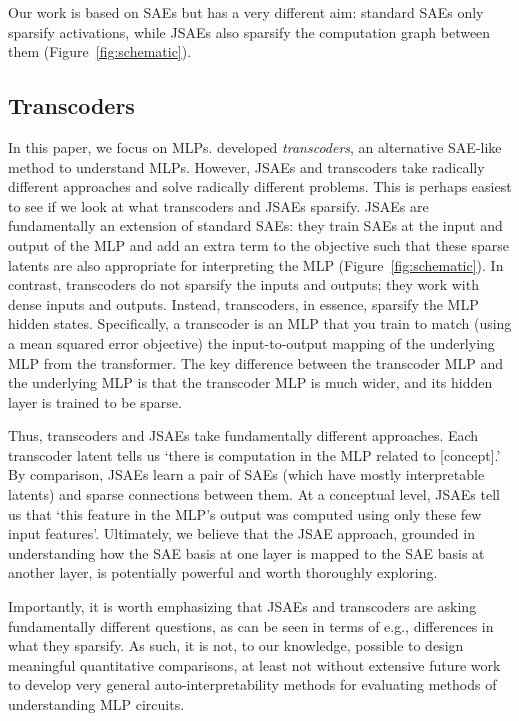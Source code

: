 Our work is based on SAEs but has a very different aim: standard SAEs only sparsify activations, while JSAEs also sparsify the computation graph between them (Figure~\ref{fig:schematic}).

\subsection{Transcoders}

In this paper, we focus on MLPs.
\citet{dunefsky_transcoders_2024,templeton_predicting_2024} developed \emph{transcoders}, an alternative SAE-like method to understand MLPs. 
However, JSAEs and transcoders take radically different approaches and solve radically different problems.
This is perhaps easiest to see if we look at what transcoders and JSAEs sparsify.
JSAEs are fundamentally an extension of standard SAEs: they train SAEs at the input and output of the MLP and add an extra term to the objective such that these sparse latents are also appropriate for interpreting the MLP (Figure~\ref{fig:schematic}).
In contrast, transcoders do not sparsify the inputs and outputs; they work with dense inputs and outputs.
Instead, transcoders, in essence, sparsify the MLP hidden states.
Specifically, a transcoder is an MLP that you train to match (using a mean squared error objective) the input-to-output mapping of the underlying MLP from the transformer.
The key difference between the transcoder MLP and the underlying MLP is that the transcoder MLP is much wider, and its hidden layer is trained to be sparse.

Thus, transcoders and JSAEs take fundamentally different approaches.
Each transcoder latent tells us `there is computation in the MLP related to [concept].'
By comparison, JSAEs learn a pair of SAEs (which have mostly interpretable latents) and sparse connections between them.
At a conceptual level, JSAEs tell us that `this feature in the MLP's output was computed using only these few input features'.
Ultimately, we believe that the JSAE approach, grounded in understanding how the SAE basis at one layer is mapped to the SAE basis at another layer, is potentially powerful and worth thoroughly exploring.

Importantly, it is worth emphasizing that JSAEs and transcoders are asking fundamentally different questions, as can be seen in terms of e.g., differences in what they sparsify.  
As such, it is not, to our knowledge, possible to design meaningful quantitative comparisons, at least not without extensive future work to develop very general auto-interpretability methods for evaluating methods of understanding MLP circuits.

